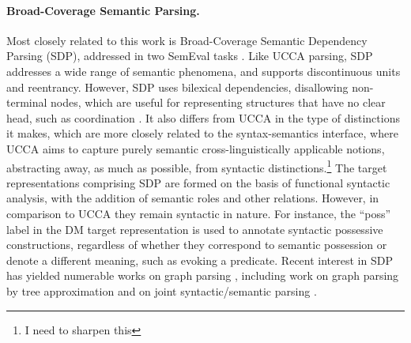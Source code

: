 \documentclass[11pt,a4paper]{article}
\newcommand{\oa}[1]{\footnote{\color{red} #1}}
\newcommand{\secref}[1]{Section~\ref{#1}}
\begin{document}
\paragraph{Broad-Coverage Semantic Parsing.}
Most closely related to this work is Broad-Coverage Semantic Dependency Parsing (SDP),
addressed in two SemEval tasks \cite{oepen2014semeval,oepen2015semeval}.
Like UCCA parsing, SDP addresses a wide range of semantic phenomena,
and supports discontinuous units and reentrancy.
However, SDP uses bilexical dependencies, disallowing non-terminal nodes, which
are useful for representing structures that have no clear head, such as coordination
\cite[see \secref{sec:ucca}]{Ivanova2012who}. It also differs from UCCA in the type
of distinctions it makes, which are more closely related to the syntax-semantics interface,
where UCCA aims to capture purely semantic cross-linguistically applicable notions, abstracting
away, as much as possible, from syntactic distinctions.\oa{I need to sharpen this}
The target representations comprising SDP are formed on the basis of functional syntactic
analysis, with the addition of semantic roles and other relations.
However, in comparison to UCCA they remain syntactic in nature.
For instance, the ``poss'' label in the DM target representation is used to
annotate syntactic possessive constructions, regardless of whether they correspond to
semantic possession or denote a different meaning, such as evoking a predicate.
Recent interest in SDP has yielded numerable works on graph parsing
\cite{ribeyre-villemontedelaclergerie-seddah:2014:SemEval,thomson-EtAl:2014:SemEval,almeida-martins:2015:SemEval,du-EtAl:2015:SemEval}, including work on graph parsing
by tree approximation \cite{agic-koller:2014:SemEval,schluter-EtAl:2014:SemEval}
and on joint syntactic/semantic parsing
\cite{henderson2013multilingual,swayamdipta-EtAl:2016:CoNLL}.
\end{document}
